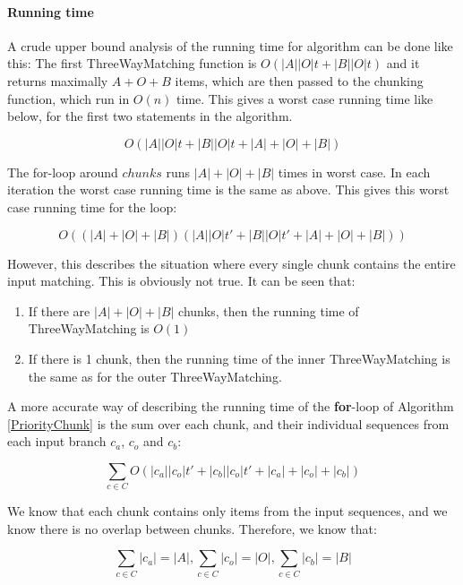 \documentclass[11pt]{article}
\begin{document}
\paragraph{Running time} A crude upper bound analysis of the running time for algorithm can be done like this: The first ThreeWayMatching function is  $O(|A||O|t + |B||O|t)$ and it returns maximally $A+O+B$ items, which are then passed to the chunking function, which run in $O(n)$ time. This gives a worst case running time like below, for the first two statements in the algorithm.

\begin{equation}
O(|A||O|t + |B||O|t + |A|+|O|+|B|) \nonumber
\end{equation}

The for-loop around $chunks$ runs $|A|+|O|+|B|$ times in worst case. In each iteration the worst case running time is the same as above. This gives this worst case running time for the loop:

\begin{equation}
O((|A| + |O| + |B|) (|A||O|t' + |B||O|t' + |A|+|O|+|B|)) \nonumber
\end{equation}

However, this describes the situation where every single chunk contains the entire input matching. This is obviously not true. It can be seen that:

\begin{enumerate}
\item If there are $|A|+|O|+|B|$ chunks, then the running time of ThreeWayMatching is $O(1)$
\item If there is 1 chunk, then the running time of the inner ThreeWayMatching is the same as for the outer ThreeWayMatching.
\end{enumerate}

A more accurate way of describing the running time of the \textbf{for}-loop of Algorithm \ref{PriorityChunk} is the sum over each chunk, and their individual sequences from each input branch $c_a$, $c_o$ and $c_b$:

\begin{equation}
\sum_{c \in C} O(|c_a||c_o|t' + |c_b||c_o|t' + |c_a|+|c_o|+|c_b|) \nonumber
\end{equation}

We know that each chunk contains only items from the input sequences, and we know there is no overlap between chunks. Therefore, we know that:

\begin{equation}
\sum_{c \in C} |c_a| = |A| \nonumber
, \sum_{c \in C} |c_o| = |O| \nonumber
, \sum_{c \in C} |c_b| = |B| \nonumber
\end{equation}
\end{document}
